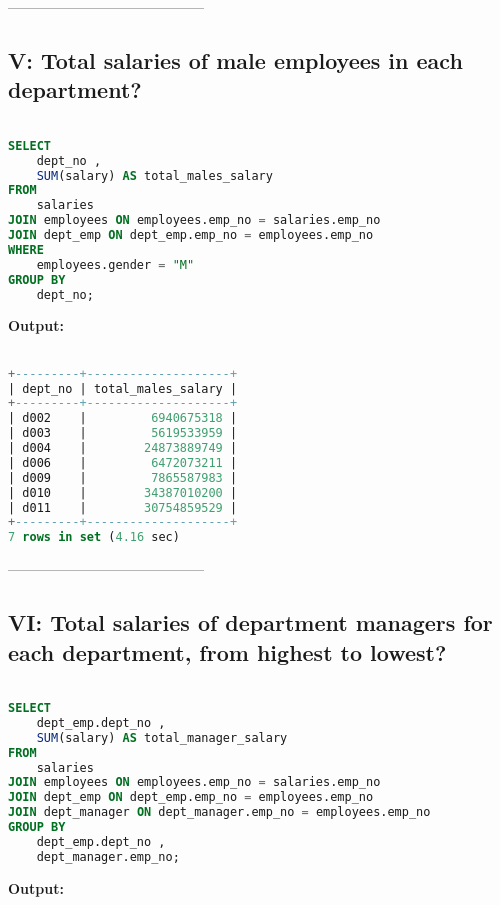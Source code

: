 \documentclass[12pt]{report}
\begin{document}
------------------------------------------

\subsection*{V: Total salaries of male employees in each department?}
\begin{lstlisting}[language=sql]

SELECT
	dept_no ,
	SUM(salary) AS total_males_salary
FROM
	salaries
JOIN employees ON employees.emp_no = salaries.emp_no
JOIN dept_emp ON dept_emp.emp_no = employees.emp_no
WHERE
	employees.gender = "M"
GROUP BY
	dept_no;

\end{lstlisting}

\textbf{Output:}

\begin{lstlisting}[language=sql]

+---------+--------------------+
| dept_no | total_males_salary |
+---------+--------------------+
| d002    |         6940675318 |
| d003    |         5619533959 |
| d004    |        24873889749 |
| d006    |         6472073211 |
| d009    |         7865587983 |
| d010    |        34387010200 |
| d011    |        30754859529 |
+---------+--------------------+
7 rows in set (4.16 sec)

\end{lstlisting}

------------------------------------------

\subsection*{VI: Total salaries of department managers for each department,
from highest to lowest?}
\begin{lstlisting}[language=sql]

SELECT
	dept_emp.dept_no ,
	SUM(salary) AS total_manager_salary
FROM
	salaries
JOIN employees ON employees.emp_no = salaries.emp_no
JOIN dept_emp ON dept_emp.emp_no = employees.emp_no
JOIN dept_manager ON dept_manager.emp_no = employees.emp_no
GROUP BY
	dept_emp.dept_no ,
	dept_manager.emp_no;

\end{lstlisting}

\textbf{Output:}
\end{document}
